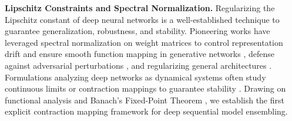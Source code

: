 \textbf{Lipschitz Constraints and Spectral Normalization.} 
Regularizing the Lipschitz constant of deep neural networks is a well-established technique to guarantee generalization, robustness, and stability. Pioneering works have leveraged spectral normalization on weight matrices to control representation drift and ensure smooth function mapping in generative networks \cite{miyato2018spectral}, defense against adversarial perturbations \cite{tsuzuku2018lipschitz}, and regularizing general architectures \cite{gouk2021regularisation, anil2019sorting, bartlett2017spectrally}. Formulations analyzing deep networks as dynamical systems often study continuous limits or contraction mappings to guarantee stability \cite{hale1969ordinary, scaman2018lipschitz, virmaux2018lipschitz}. Drawing on functional analysis \cite{rudin1976principles, kreyszig1978introductory} and Banach's Fixed-Point Theorem \cite{banach1922operations}, we establish the first explicit contraction mapping framework for deep sequential model ensembling.
